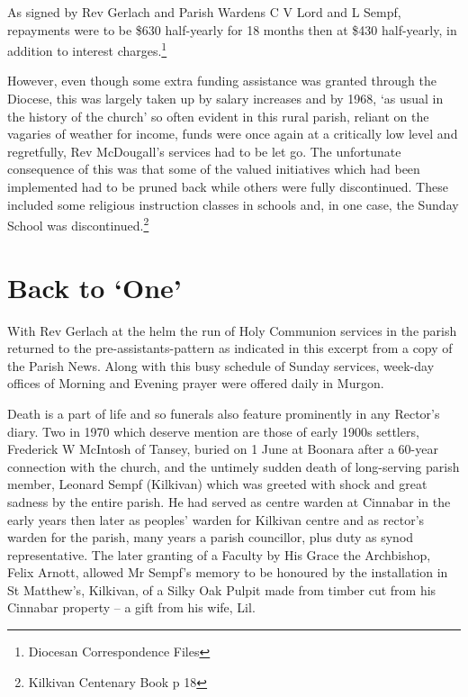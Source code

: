 As signed by Rev Gerlach and Parish Wardens C V Lord and L Sempf, repayments were to be \$630 half-yearly for 18 months then at \$430 half-yearly, in addition to interest charges.\footnote{Diocesan Correspondence Files}


However, even though some extra funding assistance was granted through the Diocese, this was largely taken up by salary increases and by 1968, `as usual in the history of the church' so often evident in this rural parish, reliant on the vagaries of weather for income, funds were once again at a critically low level and regretfully, Rev McDougall's services had to be let go. The unfortunate consequence of this was that some of the valued initiatives which had been implemented had to be pruned back while others were fully discontinued. These included some religious instruction classes in schools and, in one case, the Sunday School was discontinued.\footnote{Kilkivan Centenary Book p 18}


\section{Back to `One'}



With Rev Gerlach at the helm the run of Holy Communion services in the parish returned to the pre-assistants-pattern as indicated in this excerpt from a copy of the Parish News. Along with this busy schedule of Sunday services, week-day offices of Morning and Evening prayer were offered daily in Murgon.



Death is a part of life and so funerals also feature prominently in any Rector's diary. Two in 1970 which deserve mention are those of early 1900s settlers, Frederick W McIntosh of Tansey, buried on 1 June at Boonara after a 60-year connection with the church, and the untimely sudden death of long-serving parish member, Leonard Sempf (Kilkivan) which was greeted with shock and great sadness by the entire parish. He had served as centre warden at Cinnabar in the early years then later as peoples' warden for Kilkivan centre and as rector's warden for the parish, many years a parish councillor, plus duty as synod representative. The later granting of a Faculty by His Grace the Archbishop, Felix Arnott, allowed Mr Sempf's memory to be honoured by the installation in St Matthew's, Kilkivan, of a Silky Oak Pulpit made from timber cut from his Cinnabar property -- a gift from his wife, Lil.



